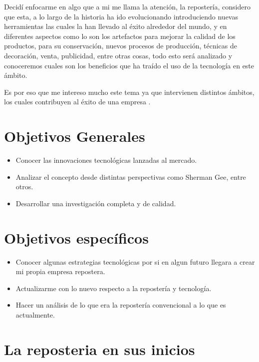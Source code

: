 \documentclass{bmcart}
\begin{document}
Decidí enfocarme en algo que a mi me llama la atención, la repostería, considero que esta, a lo largo de la historia ha ido evolucionando introduciendo nuevas herramientas las cuales la han llevado al éxito alrededor del mundo, y en diferentes aspectos como lo son los artefactos para mejorar la calidad de los productos, para su conservación, nuevos procesos de producción, técnicas de decoración, venta, publicidad, entre otras cosas, todo esto será analizado y conoceremos cuales son los beneficios que ha traído el uso de la tecnología en este ámbito.


Es por eso que me intereso mucho este tema ya que intervienen distintos ámbitos, los cuales contribuyen al éxito de una empresa .

\newpage
\section{Objetivos Generales}
	\begin{itemize}
\item Conocer las innovaciones tecnológicas lanzadas al mercado.
\item Analizar el concepto desde distintas perspectivas como Sherman Gee, entre otros.
\item Desarrollar una investigación completa y de calidad.
\newline
		\newline
		\newline
	\end{itemize}
		
\section{Objetivos específicos}
\begin{itemize}
\item Conocer algunas estrategias tecnológicas por si en algun futuro llegara a crear mi propia empresa repostera.
\item Actualizarme con lo nuevo respecto a la repostería y tecnología.
\item Hacer un análisis de lo que era la repostería convencional a lo que es actualmente.

	\end{itemize}

\newpage

\section{La reposteria en sus inicios}
\end{document}
